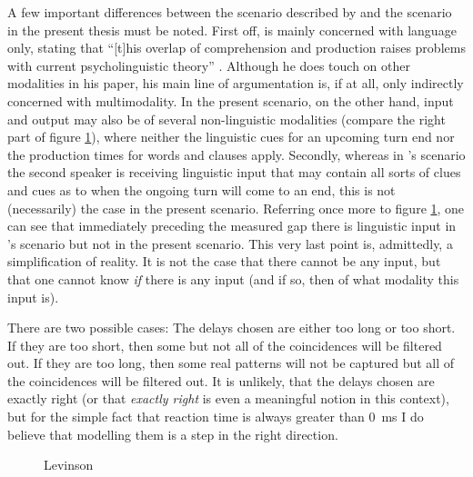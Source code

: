 A few important differences between the scenario described by \citeauthor{levinson16} and the scenario in the present thesis must be noted. First off, \citeauthor{levinson16} is mainly concerned with language only, stating that ``[t]his overlap of comprehension and production raises problems with current psycholinguistic theory'' \citeyearpar[]{levinson16}. Although he does touch on other modalities in his paper, his main line of argumentation is, if at all, only indirectly concerned with multimodality. In the present scenario, on the other hand, input and output may also be of several non-linguistic modalities (compare the right part of figure \ref{fig:levinson}), where neither the linguistic cues for an upcoming turn end nor the production times for words and clauses apply. Secondly, whereas in \citeauthor{levinson16}'s scenario the second speaker is receiving linguistic input that may contain all sorts of clues and cues as to when the ongoing turn will come to an end, this is not (necessarily) the case in the present scenario. Referring once more to figure \ref{fig:levinson}, one can see that immediately preceding the measured gap there is linguistic input in \citeauthor{levinson16}'s scenario but not in the present scenario. This very last point is, admittedly, a simplification of reality. It is not the case that there cannot be any input, but that one cannot know \emph{if} there is any input (and if so, then of what modality this input is).

There are two possible cases: The delays chosen are either too long or too short. If they are too short, then some but not all of the coincidences will be filtered out. If they are too long, then some real patterns will not be captured but all of the coincidences will be filtered out. It is unlikely, that the delays chosen are exactly right (or that \emph{exactly right} is even a meaningful notion in this context), but for the simple fact that reaction time is always greater than 0~ms I do believe that modelling them is a step in the right direction.

\begin{figure}
	\centering
	
	\caption{Levinson}
	\label{fig:levinson}
\end{figure}


